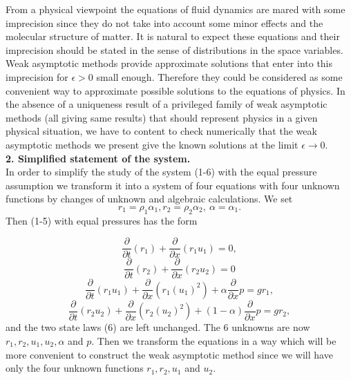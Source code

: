 \documentclass[a4paper,12pt]{article}
\begin{document}
From a physical viewpoint the equations of fluid dynamics are mared with some imprecision since they do not take into account some minor effects and the molecular structure of matter. It is natural to expect these equations and their imprecision should be stated in the sense of distributions in the space variables. Weak asymptotic methods provide approximate solutions that enter into this imprecision for $\epsilon>0$ small enough. Therefore they could be considered as some convenient way to approximate possible solutions to the equations of physics. In the absence of a uniqueness result of a privileged family of weak asymptotic methods (all giving same results) that should represent physics in a given physical situation, we have to content to check numerically that the weak asymptotic methods we present give the known solutions at the limit $\epsilon\rightarrow 0$.\\



\textbf{2. Simplified statement of the system.}\\ In order to simplify the study of the system (1-6) with the equal pressure assumption we transform it into a system of four equations with four unknown functions by changes of unknown and  algebraic calculations. We set
\begin{equation} r_1=\rho_1 \alpha_1, r_2=\rho_2 \alpha_2, \ \alpha=\alpha_1. \end{equation}
Then (1-5) with equal pressures  has the form  

\begin{equation}\frac{\partial}{\partial t}(r_1)+\frac{\partial}{\partial x}(r_1u_1)=0,\end{equation}
\begin{equation}\frac{\partial}{\partial t}(r_2)+\frac{\partial}{\partial x}(r_2u_2)=0\end{equation}
\begin{equation}\frac{\partial}{\partial t}(r_1u_1)+\frac{\partial}{\partial x}(r_1(u_1)^2)+\alpha \frac{\partial}{\partial x}p=gr_1,\end{equation}
\begin{equation}\frac{\partial}{\partial t}(r_2u_2)+\frac{\partial}{\partial x}(r_2(u_2)^2)+(1-\alpha)\frac{\partial}{\partial x}p=gr_2,\end{equation}
and  the two state laws (6) are left unchanged. The  6 unknowns are now $r_1, r_2, u_1, u_2, \alpha$ and $ p$. Then we transform the equations in a way which will be more convenient to construct the weak asymptotic  method since we will have only the four unknown functions $r_1, r_2, u_1$ and $u_2$.\\
\end{document}
